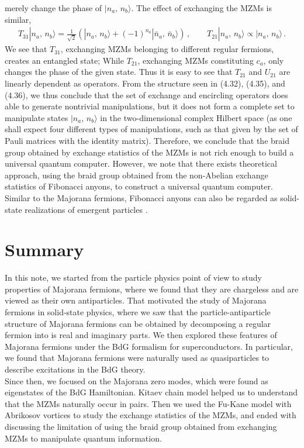 \documentclass[11pt, oneside]{book}
\theoremstyle{break}
\theoremstyle{break}
\begin{document}
merely change the phase of $|n_a,\, n_b\rangle$. The effect of exchanging the MZMs is similar, 
\begin{align}
T_{31}|n_a,\, n_b\rangle = \frac{1}{\sqrt{2}}\left( |n_a,\, n_b\rangle + (-1)^{n_a} |\bar{n}_a,\, \bar{n}_b\rangle\right)\,,\qquad
T_{21} |n_a,\, n_b\rangle \propto |n_a,\, n_b\rangle\,.
\end{align}
We see that $T_{31}$, exchanging MZMs belonging to different regular fermions, creates an entangled state; While $T_{21}$, exchanging MZMs constituting $c_a$, only changes the phase of the given state. Thus it is easy to see that $T_{21}$ and $U_{21}$ are linearly dependent as operators. From the structure seen in (4.32), (4.35), and (4.36), we thus conclude that the set of exchange and encircling operators does able to generate nontrivial manipulations, but it does not form a complete set to manipulate states $|n_a,\, n_b\rangle$ in the two-dimensional complex Hilbert space (as one shall expect four different types of manipulations, such as that given by the set of Pauli matrices with the identity matrix). Therefore, we conclude that the braid group obtained by exchange statistics of the MZMs is not rich enough to build a universal quantum computer. However, we note that there exists theoretical approach, using the braid group obtained from the non-Abelian exchange statistics of Fibonacci anyons, to construct a universal quantum computer. Similar to the Majorana fermions, Fibonacci anyons can also be regarded as solid-state realizations of emergent particles \cite{Nayak}. 

\section*{Summary}
In this note, we started from the particle physics point of view to study properties of Majorana fermions, where we found that they are chargeless and are viewed as their own antiparticles. That motivated the study of Majorana fermions in solid-state physics, where we saw that the particle-antiparticle structure of Majorana fermions can be obtained by decomposing a regular fermion into is real and imaginary parts. We then explored these features of Majorana fermions under the BdG formalism for superconductors. In particular, we found that Majorana fermions were naturally used as quasiparticles to describe excitations in the BdG theory.\\

Since then, we focused on the Majorana zero modes, which were found as eigenstates of the BdG Hamiltonian. Kitaev chain model helped us to understand that the MZMs naturally occur in pairs. Then we used the Fu-Kane model with Abrikosov vortices to study the exchange statistics of the MZMs, and ended with discussing the limitation of using the braid group obtained from exchanging MZMs to manipulate quantum information.\\
\end{document}
